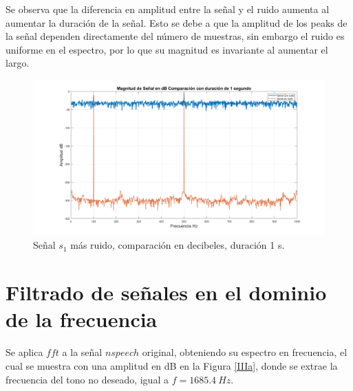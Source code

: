 \documentclass[letterpaper,onecolumn,10pt,journal,final]{IEEEtran}
\begin{document}
\begin{itemize}
Se observa que la diferencia en amplitud entre la señal y el ruido aumenta al aumentar la duración de la señal. Esto se debe a que la amplitud de los peaks de la señal dependen directamente del número de muestras, sin embargo el ruido es uniforme en el espectro, por lo que su magnitud es invariante al aumentar el largo.

\begin{figure}[H]
\centering
\includegraphics[width=1 \linewidth]{Figuras/IId.png}
\caption{Señal $s_1$ más ruido, comparación en decibeles, duración 1 s.}
\label{IId}
\end{figure} 

\end{itemize}
%
%
\section{Filtrado de señales en el dominio de la frecuencia}

Se aplica $fft$ a la señal $nspeech$ original, obteniendo su espectro en frecuencia, el cual se muestra con una amplitud en dB en la Figura \ref{IIIa}, donde se extrae la frecuencia del tono no deseado, igual a $f = 1685.4 ~ Hz$.
\end{document}
